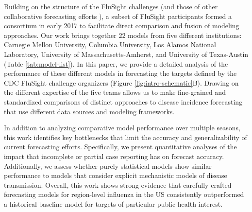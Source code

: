 \documentclass[9pt,twocolumn,twoside]{pnas-new}\usepackage[]{graphicx}\usepackage[]{color}
\begin{document}
Building on the structure of the FluSight challenges (and those of other collaborative forecasting efforts \cite{Smith2017,Viboud2017}), a subset of FluSight participants formed a consortium in early 2017 to facilitate direct comparison and fusion of modeling approaches. 
Our work brings together 22 models from five different institutions: Carnegie Mellon University, Columbia University, Los Alamos National Laboratory, University of Massachusetts-Amherst, and University of Texas-Austin (Table \ref{tab:model-list}).
In this paper, we provide a detailed analysis of the performance of these different models in forecasting the targets defined by the CDC FluSight challenge organizers (Figure \ref{fig:intro-schematic}B).
Drawing on the different expertise of the five teams allows us to make fine-grained and standardized comparisons of distinct approaches to disease incidence forecasting that use different data sources and modeling frameworks.

In addition to analyzing comparative model performance over multiple seasons, this work identifies key bottlenecks that limit the accuracy and generalizability of current forecasting efforts.
Specifically, we present quantitative analyses of the impact that incomplete or partial case reporting has on forecast accuracy.
Additionally, we assess whether purely statistical models show similar performance to models that consider explicit mechanistic models of disease transmission.
Overall, this work shows strong evidence that carefully crafted forecasting models for region-level influenza in the US consistently outperformed a historical baseline model for targets of particular public health interest. 
\end{document}
